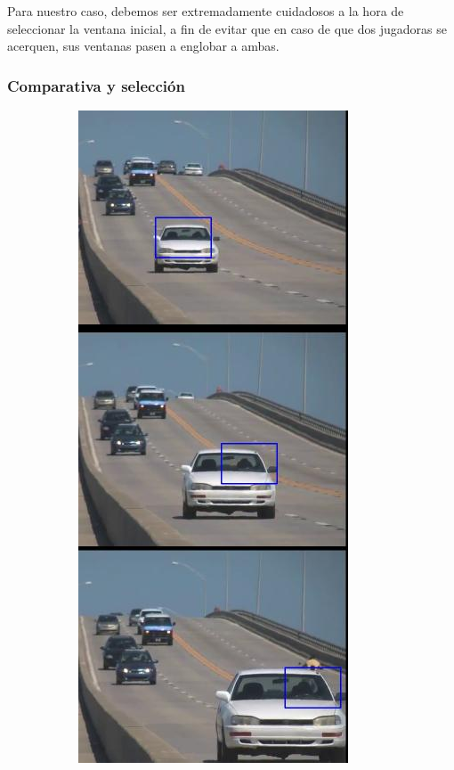 Para nuestro caso, debemos ser extremadamente cuidadosos a la hora de seleccionar la ventana inicial, a fin de evitar que en caso de que dos jugadoras se acerquen, sus ventanas pasen a englobar a ambas.

\subsubsection*{Comparativa y selección}

\begin{figure}
  \begin{subfigure}{.5\textwidth}
    \centering
    \includegraphics[width=.45\textwidth]{images/cochemeanshift}
    \caption{}
    \label{fig:ejemplos1a}
  \end{subfigure}
  \begin{subfigure}{.4\textwidth}
    \centering

\end{subfigure}
\end{figure}
